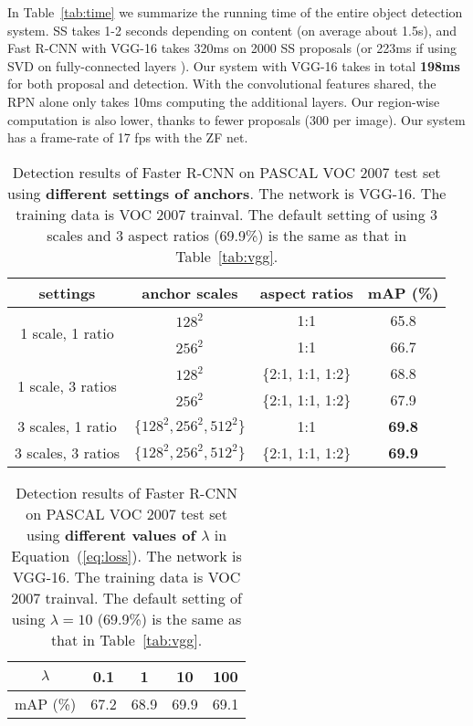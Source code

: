 \documentclass[10pt,journal,cspaper,compsoc]{IEEEtran}
\begin{document}
In Table~\ref{tab:time} we summarize the running time of the entire object detection system. SS takes 1-2 seconds depending on content (on average about 1.5s), and Fast R-CNN with VGG-16 takes 320ms on 2000 SS proposals (or 223ms if using SVD on fully-connected layers \cite{Girshick2015a}). Our system with VGG-16 takes in total \textbf{198ms} for both proposal and detection. With the convolutional features shared, the RPN alone only takes 10ms computing the additional layers.
Our region-wise computation is also lower, thanks to fewer proposals (300 per image). Our system has a frame-rate of 17 fps with the ZF net.

\setlength{\tabcolsep}{2pt}
\renewcommand{\arraystretch}{1.1}
\begin{table}[t]
\begin{center}
\caption{Detection results of Faster R-CNN on PASCAL VOC 2007 test set using \textbf{different settings of anchors}. The network is VGG-16. The training data is VOC 2007 trainval. The default setting of using 3 scales and 3 aspect ratios (69.9\%) is the same as that in Table~\ref{tab:vgg}.}
\vspace{-1em}
\small
\begin{tabular}{c|c|c|c}
settings &  anchor scales & aspect ratios & mAP (\%)\\
\hline
\hline
\multirow{2}{*}{1 scale, 1 ratio} & \footnotesize $128^2$ & 1:1 & 65.8 \\
                                  & \footnotesize $256^2$ & 1:1 & 66.7 \\
\hline
\multirow{2}{*}{1 scale, 3 ratios} & \footnotesize $128^2$ & \{2:1, 1:1, 1:2\} & 68.8 \\
                                   & \footnotesize $256^2$ & \{2:1, 1:1, 1:2\} & 67.9 \\
\hline
\multirow{1}{*}{3 scales, 1 ratio} & \footnotesize $\{128^2, 256^2, 512^2\}$ & 1:1 & \textbf{69.8} \\
\hline
\multirow{1}{*}{3 scales, 3 ratios} &  \footnotesize $\{128^2, 256^2, 512^2\}$ & \{2:1, 1:1, 1:2\} & \textbf{69.9} \\
\end{tabular}
\label{tab:anchors}
\end{center}
\end{table}

\setlength{\tabcolsep}{10pt}
\begin{table}[t]
\begin{center}
\caption{Detection results of Faster R-CNN on PASCAL VOC 2007 test set using \textbf{different values of $\lambda$} in Equation~(\ref{eq:loss}). The network is VGG-16. The training data is VOC 2007 trainval. The default setting of using $\lambda=10$ (69.9\%) is the same as that in Table~\ref{tab:vgg}.}
\vspace{-1em}
\small
\begin{tabular}{c|cccc}
$\lambda$ & 0.1 & 1 & 10 & 100\\
\hline
mAP (\%) & 67.2 & 68.9 & 69.9 & 69.1\\
\end{tabular}
\label{tab:lambda}
\end{center}
\end{table}
\end{document}
